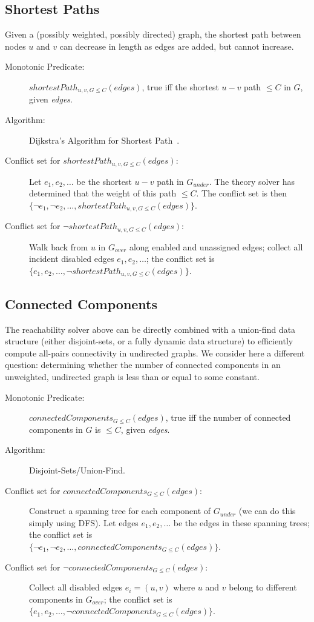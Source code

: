 \documentclass[runningheads]{llncs}
\newcommand{\gunder}{G_{under}}
\newcommand{\gover}{G_{over}}
\begin{document}
\subsection{{Shortest Paths}}
Given a (possibly weighted, possibly directed) graph, the shortest path between nodes $u$ and $v$ can decrease in length as edges are added, but cannot increase. 

\begin{description}
\item[Monotonic Predicate:] $shortestPath_{u,v,G \leq C}(edges)$, true iff the shortest $u-v$ path $\leq C$ in $G$, given \textit{edges}. \item[Algorithm:] Dijkstra's Algorithm for Shortest Path~\cite{dijkstra1959note}.
\item[Conflict set for $shortestPath_{u,v,G \leq C}(edges)$:] Let $e_1, e_2, \ldots$
be the shortest $u-v$ path in $\gunder$.  The theory solver has determined
that the weight of this path $\le C$.  The conflict set is
then $\{\lnot e_1, \lnot e_2, \ldots, shortestPath_{u,v,G \leq C}(edges)\}$.
\item[Conflict set for $\lnot shortestPath_{u,v,G \leq C}(edges)$:] Walk back from $u$ in $\gover$ along enabled and unassigned edges; collect all incident disabled edges $e_1, e_2, \ldots$; the conflict set is $\{e_1, e_2, \ldots, \lnot shortestPath_{u,v,G \leq C}(edges)\}$.

\end{description}

\subsection{{Connected Components}}
The reachability solver above can be directly combined with a union-find data structure (either disjoint-sets, or a fully dynamic data structure\cite{holm2001poly}) to efficiently compute all-pairs connectivity in undirected graphs. We consider here a different question: determining whether the number of connected components in an unweighted, undirected graph is less than or equal to some constant. 

\begin{description}
\item[Monotonic Predicate:] $connectedComponents_{G \leq C}(edges)$, true iff the number of connected components in $G$ is $\leq C$, given \textit{edges}. 
\item[Algorithm:] Disjoint-Sets/Union-Find.
\item[Conflict set for $connectedComponents_{G \leq C}(edges)$:]  Construct a spanning tree for each component of $\gunder$ (we can do this simply using DFS). Let edges $e_1, e_2, \ldots$ be the edges in these spanning trees; the conflict set is\\ $\{\lnot e_1, \lnot e_2, \ldots, connectedComponents_{G \leq C}(edges)\}$.
\item[Conflict set for $\lnot connectedComponents_{G \leq C}(edges)$:] Collect all disabled edges $e_i=(u,v)$ where $u$ and $v$ belong to different components in $\gover$;
the conflict set is $\{e_1, e_2, \ldots, \lnot connectedComponents_{G \leq C}(edges)\}$.

\end{description}
\end{document}
